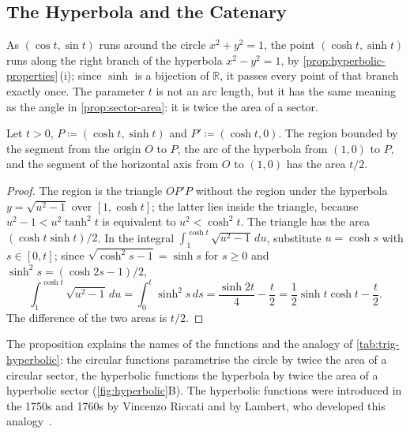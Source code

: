 \subsection{The Hyperbola and the Catenary}

As $(\cos t,\sin t)$ runs around the circle $x^2+y^2=1$, the point $(\cosh t,\sinh t)$ runs along the right branch of the hyperbola $x^2-y^2=1$, by \cref{prop:hyperbolic-properties}\,(i); since $\sinh$ is a bijection of $\mathbb R$, it passes every point of that branch exactly once. The parameter $t$ is not an arc length, but it has the same meaning as the angle in \cref{prop:sector-area}: it is twice the area of a sector.

\begin{proposition}
\label{prop:hyperbolic-sector}
Let $t>0$, $P\coloneqq(\cosh t,\sinh t)$ and $P'\coloneqq(\cosh t,0)$. The region bounded by the segment from the origin $O$ to $P$, the arc of the hyperbola from $(1,0)$ to $P$, and the segment of the horizontal axis from $O$ to $(1,0)$ has the area $t/2$.
\end{proposition}

\begin{proof}
The region is the triangle $OP'P$ without the region under the hyperbola $y=\sqrt{u^2-1}$ over $[1,\cosh t]$; the latter lies inside the triangle, because $u^2-1<u^2\tanh^2t$ is equivalent to $u^2<\cosh^2t$. The triangle has the area $(\cosh t\sinh t)/2$. In the integral $\int_1^{\cosh t}\sqrt{u^2-1}\,du$, substitute $u=\cosh s$ with $s\in[0,t]$; since $\sqrt{\cosh^2s-1}=\sinh s$ for $s\ge0$ and $\sinh^2s=(\cosh2s-1)/2$,
\[
\int_1^{\cosh t}\sqrt{u^2-1}\,du=\int_0^t\sinh^2s\,ds=\frac{\sinh2t}4-\frac t2=\frac12\sinh t\cosh t-\frac t2 .
\]
The difference of the two areas is $t/2$.
\end{proof}

The proposition explains the names of the functions and the analogy of \cref{tab:trig-hyperbolic}: the circular functions parametrise the circle by twice the area of a circular sector, the hyperbolic functions the hyperbola by twice the area of a hyperbolic sector (\cref{fig:hyperbolic}B). The hyperbolic functions were introduced in the 1750s and 1760s by Vincenzo Riccati and by Lambert, who developed this analogy~\cite{maor1994}.

